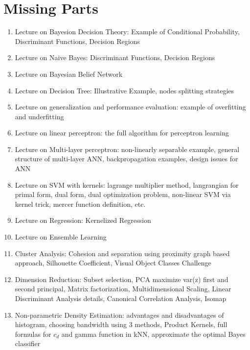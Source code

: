 \chapter{Missing Parts}

\begin{enumerate}
    \item Lecture on Bayesion Decision Theory: Example of Conditional Probability, Discriminant Functions, Decision Regions
    \item Lecture on Naive Bayes: Discriminant Functions, Decision Regions
    \item Lecture on Bayesian Belief Network
    \item Lecture on Decision Tree: Illustrative Example, nodes splitting strategies
    \item Lecture on generalization and performance evaluation: example of overfitting and underfitting 
    \item Lecture on linear perceptron: the full algorithm for perceptron learning
    \item Lecture on Multi-layer perceptron: non-linearly separable example, general structure of multi-layer ANN, backpropagation examples, design issues for ANN
    \item Lecture on SVM with kernels: lagrange multiplier method, langrangian for primal form, dual form, dual optimization problem, non-linear SVM via kernel trick, mercer function definition, etc.
    \item Lecture on Regression: Kernelized Regression
    \item Lecture on Ensemble Learning
    \item Cluster Analysis: Cohesion and separation using proximity graph based approach, Silhouette Coefficient, Visual Object Classes Challenge
    \item Dimension Reduction: Subset selection, PCA maximize var(z) first and second principal, Matrix factorization, Multidimensional Scaling, Linear Discriminant Analysis details, Canonical Correlation Analysis, Isomap
    \item Non-parametric Density Estimation: advantages and disadvantages of histogram, choosing bandwidth using 3 methods, Product Kernels, full formulas for $c_d$ and gamma function in kNN, approximate the optimal Bayes classifier
\end{enumerate}
